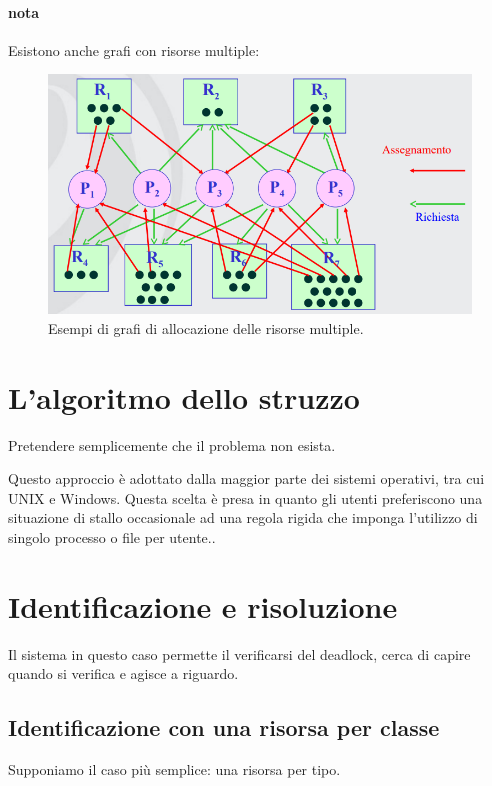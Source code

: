 \paragraph*{nota}
Esistono anche grafi con risorse multiple:
\begin{figure}[H]
    \centering
    \includegraphics[width=0.8\linewidth]{assets/grafimultiple9.png}
    \caption{Esempi di grafi di allocazione delle risorse multiple.}
\end{figure}

\paragraph*{}
\section{L'algoritmo dello struzzo}
Pretendere semplicemente che il problema non esista.

Questo approccio è adottato dalla maggior parte dei sistemi operativi, tra cui UNIX e Windows. Questa scelta è presa in quanto gli utenti preferiscono una situazione di stallo occasionale ad una regola rigida che imponga l'utilizzo di singolo processo o file per utente..

\paragraph*{}
\section{Identificazione e risoluzione}
Il sistema in questo caso permette il verificarsi del deadlock, cerca di capire quando si verifica e agisce a riguardo.

\subsection{Identificazione con una risorsa per classe}
Supponiamo il caso più semplice: una risorsa per tipo.

